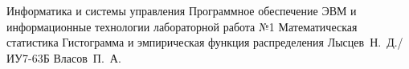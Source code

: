 \documentclass{bmstu}
\begin{document}
\makereporttitle
{Информатика и системы управления} %
{Программное обеспечение ЭВМ и информационные технологии}
{лабораторной работа №1} %
{Математическая статистика} %
{Гистограмма и эмпирическая функция распределения} %
{} %
{Лысцев~Н.~Д./ИУ7-63Б} %
{Власов~П.~А.} %
{}

\maketableofcontents



%

%
%

\end{document}
